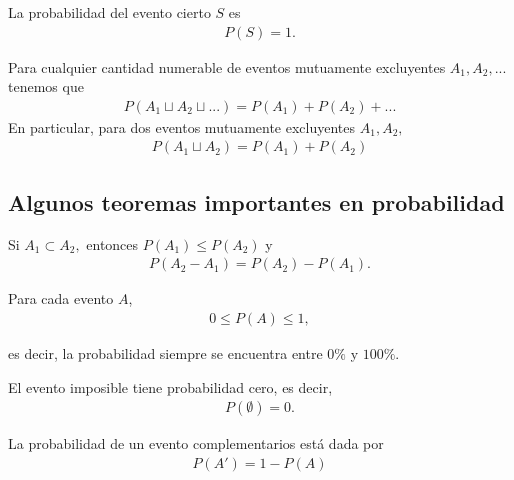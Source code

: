 \begin{axiom}
   La probabilidad del evento cierto $S$ es
   \begin{align}
   \label{eq:0.1.2}
    P(S)=1.
   \end{align}
\end{axiom}



\begin{axiom}
  Para cualquier cantidad numerable de eventos mutuamente excluyentes
  $A_{1},A_{2},...$ tenemos que
  \begin{align}
   \label{eq:0.1.3}
   P(A_{1}\sqcup A_{2} \sqcup ...)=P(A_{1})+P(A_{2})+...
  \end{align}
En particular, para dos eventos mutuamente excluyentes $A_{1},A_{2},$
\begin{align}
	\label{eq:0.1.4}
 P(A_{1}\sqcup A_{2})=P(A_{1})+P(A_{2})
\end{align}

\end{axiom}


\subsection{Algunos teoremas importantes en probabilidad}
{}
	\begin{thm}
	 \label{thm:0.1.1}
	 Si $A_{1}\subset A_{2},$ entonces $P(A_{1})\leq P(A_{2})$ y
	 \begin{align*}
		P(A_{2}-A_{1})=P(A_{2})-P(A_{1}).
\end{align*}
	\end{thm}


{}
\begin{thm}
 \label{thm:0.1.2}
 Para cada evento $A$,
 \begin{align}
  \label{eq:0.1.5}
  0\leq P(A) \leq 1,
 \end{align}

es decir, la probabilidad siempre se encuentra entre $0\%$ y $100\%.$
\end{thm}


\begin{thm}
	\label{thm:0.1.3}
 El evento imposible tiene probabilidad cero, es decir,
 \begin{align}
  P(\emptyset)=0.
 \end{align}
\end{thm}


{}
\begin{thm}
 \label{thm:0.1.4} La probabilidad de un evento complementarios está dada por
 \begin{align}
 \label{eq:0.1.7}
   P(A')=1-P(A)
  \end{align}
\end{thm}


